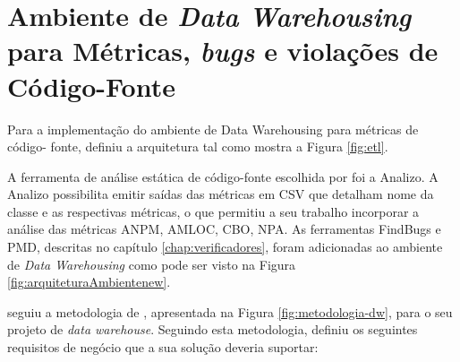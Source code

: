 \section{Ambiente de \textit{Data Warehousing} para Métricas, \textit{bugs} e violações de Código-Fonte}


Para a implementação do ambiente de Data Warehousing para métricas de código-
fonte,  definiu a arquitetura tal como mostra a Figura \ref{fig:etl}.

A ferramenta de análise estática de código-fonte escolhida por  foi a Analizo. A Analizo  possibilita emitir saídas das métricas em CSV que detalham nome da classe e as respectivas métricas, o que permitiu a seu trabalho incorporar a análise das métricas ANPM, AMLOC, CBO, NPA. As ferramentas FindBugs e PMD, descritas no capítulo \ref{chap:verificadores}, foram adicionadas ao ambiente de \textit{Data Warehousing} como pode ser visto na Figura \ref{fig:arquiteturaAmbientenew}. 

 seguiu a metodologia de \cite{Kimball2002}, apresentada na Figura \ref{fig:metodologia-dw}, para o seu projeto de \textit{data warehouse}. Seguindo esta metodologia,  definiu os seguintes requisitos de negócio que a sua solução deveria suportar:

